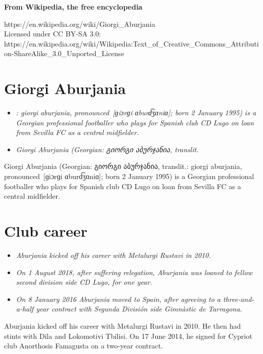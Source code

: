 \textbf{From Wikipedia, the free encyclopedia}

https://en.wikipedia.org/wiki/Giorgi\_Aburjania\\
Licensed under CC BY-SA 3.0:\\
https://en.wikipedia.org/wiki/Wikipedia:Text\_of\_Creative\_Commons\_Attribution-ShareAlike\_3.0\_Unported\_License

\section{Giorgi Aburjania}\label{giorgi-aburjania}

\begin{itemize}
\item
  \emph{: giorgi aburjania, pronounced~{[}ɡiɔrɡi ɑburd͡ʒɑniɑ{]}; born 2
  January 1995) is a Georgian professional footballer who plays for
  Spanish club CD Lugo on loan from Sevilla FC as a central midfielder.}
\item
  \emph{Giorgi Aburjania (Georgian: გიორგი აბურჯანია, translit.}
\end{itemize}

Giorgi Aburjania (Georgian: გიორგი აბურჯანია, translit.: giorgi
aburjania, pronounced~{[}ɡiɔrɡi ɑburd͡ʒɑniɑ{]}; born 2 January 1995) is a
Georgian professional footballer who plays for Spanish club CD Lugo on
loan from Sevilla FC as a central midfielder.

\section{Club career}\label{club-career}

\begin{itemize}
\item
  \emph{Aburjania kicked off his career with Metalurgi Rustavi in 2010.}
\item
  \emph{On 1 August 2018, after suffering relegation, Aburjania was
  loaned to fellow second division side CD Lugo, for one year.}
\item
  \emph{On 8 January 2016 Aburjania moved to Spain, after agreeing to a
  three-and-a-half year contract with Segunda División side Gimnàstic de
  Tarragona.}
\end{itemize}

Aburjania kicked off his career with Metalurgi Rustavi in 2010. He then
had stints with Dila and Lokomotivi Tbilisi. On 17 June 2014, he signed
for Cypriot club Anorthosis Famagusta on a two-year contract.

